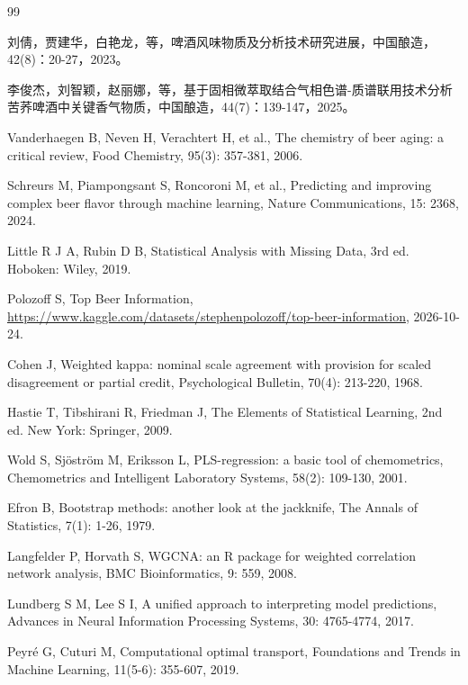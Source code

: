 \documentclass[UTF8,a4paper,zihao=-4]{ctexart}
\numberwithin{figure}{section}
\numberwithin{table}{section}
\numberwithin{equation}{section}
\begin{document}
\begin{thebibliography}{99}
\raggedright
{}

刘倩，贾建华，白艳龙，等，啤酒风味物质及分析技术研究进展，中国酿造，42(8)：20-27，2023。

李俊杰，刘智颖，赵丽娜，等，基于固相微萃取结合气相色谱-质谱联用技术分析苦荞啤酒中关键香气物质，中国酿造，44(7)：139-147，2025。

Vanderhaegen B, Neven H, Verachtert H, et al., The chemistry of beer aging: a critical review, Food Chemistry, 95(3): 357-381, 2006.

Schreurs M, Piampongsant S, Roncoroni M, et al., Predicting and improving complex beer flavor through machine learning, Nature Communications, 15: 2368, 2024.

Little R J A, Rubin D B, Statistical Analysis with Missing Data, 3rd ed. Hoboken: Wiley, 2019.

Polozoff S, Top Beer Information, \url{https://www.kaggle.com/datasets/stephenpolozoff/top-beer-information}, 2026-10-24.

Cohen J, Weighted kappa: nominal scale agreement with provision for scaled disagreement or partial credit, Psychological Bulletin, 70(4): 213-220, 1968.

Hastie T, Tibshirani R, Friedman J, The Elements of Statistical Learning, 2nd ed. New York: Springer, 2009.

Wold S, Sj\"ostr\"om M, Eriksson L, PLS-regression: a basic tool of chemometrics, Chemometrics and Intelligent Laboratory Systems, 58(2): 109-130, 2001.

Efron B, Bootstrap methods: another look at the jackknife, The Annals of Statistics, 7(1): 1-26, 1979.

Langfelder P, Horvath S, WGCNA: an R package for weighted correlation network analysis, BMC Bioinformatics, 9: 559, 2008.

Lundberg S M, Lee S I, A unified approach to interpreting model predictions, Advances in Neural Information Processing Systems, 30: 4765-4774, 2017.

Peyr\'e G, Cuturi M, Computational optimal transport, Foundations and Trends in Machine Learning, 11(5-6): 355-607, 2019.

\end{thebibliography}
\end{document}
